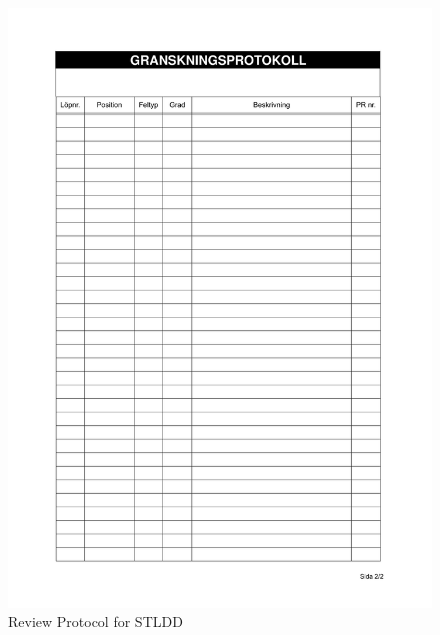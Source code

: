 \documentclass{article}
\begin{document}
 \begin{figure}
     \centering
     \includegraphics[width=13cm]{images/STLDD - Granskningsprotokoll-2}
     \renewcommand\figurename{Figure}
     \caption{Review Protocol for STLDD}
     \label{fig:my_label}
 \end{figure}
 
\end{document}
